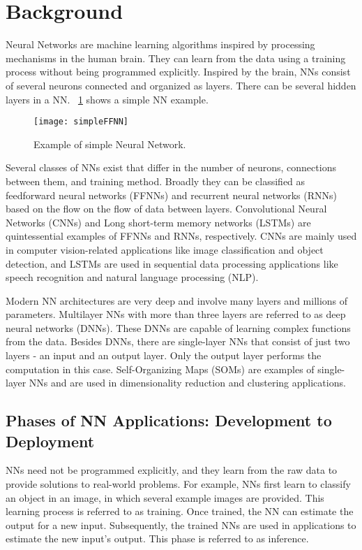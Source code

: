 \section{Background}
Neural Networks are machine learning algorithms inspired by processing mechanisms in the human brain. They can learn from the data using a training process without being programmed explicitly. Inspired by the brain, NNs consist of several neurons connected and organized as layers. There can be several hidden layers in a NN. \figurename{~\ref{fig:simpleNN}} shows a simple NN example. 
\begin{figure}[!htb]
	\centering
	\captionsetup{font=sf}
	\texttt{[image: simpleFFNN]}
	\caption{Example of simple Neural Network.}
	\label{fig:simpleNN}
\end{figure}

Several classes of NNs exist that differ in the number of neurons, connections between them, and training method. Broadly they can be classified as feedforward neural networks (FFNNs) and recurrent neural networks (RNNs) based on the flow on the flow of data between layers. Convolutional Neural Networks (CNNs) and Long short-term memory networks (LSTMs) are quintessential examples of FFNNs and RNNs, respectively. CNNs are mainly used in computer vision-related applications like image classification and object detection, and LSTMs are used in sequential data processing applications like speech recognition and natural language processing (NLP). 

Modern NN architectures are very deep and involve many layers and millions of parameters. 
Multilayer NNs with more than three layers are referred to as deep neural networks (DNNs). These DNNs are capable of learning complex functions from the data. Besides DNNs, there are single-layer NNs that consist of just two layers - an input and an output layer. Only the output layer performs the computation in this case. Self-Organizing Maps (SOMs) are examples of single-layer NNs and are used in dimensionality reduction and clustering applications. 

\subsection{Phases of NN Applications: Development to Deployment}
NNs need not be programmed explicitly, and they learn from the raw data to provide solutions to real-world problems. For example, NNs first learn to classify an object in an image, in which several example images are provided. This learning process is referred to as training. Once trained, the NN can estimate the output for a new input. Subsequently, the trained NNs are used in applications to estimate the new input's output. This phase is referred to as inference.

